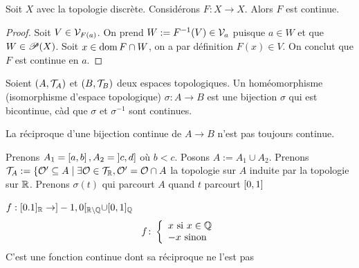 \begin{exemple}
Soit $X$ avec la topologie discrète. Considérons $F:X \to X$. Alors $F$ est continue. 
\end{exemple}
\begin{proof}
    Soit $V\in \mathcal{V}_{F(a)}$. On prend $W:=F^{-1}(V)\in \mathcal{V}_a$ puisque $a\in W$ et que $W\in \mathscr{P}(X)$. Soit $x\in \operatorname{dom} F\cap W$, on a par définition $F(x)\in V$. On conclut que $F$ est continue en $a$.
\end{proof}
\begin{definition}[Homéomorphisme]
Soient $(A,\mathcal{T}_A)$ et $(B,\mathcal{T}_B)$ deux espaces topologiques. Un homéomorphisme (isomorphisme d'espace topologique) $\sigma:A\to B$ est une bijection $\sigma$ qui est bicontinue, càd que $\sigma$ et $\sigma^{-1}$ sont continues.
\end{definition}
\begin{remarque}
    La réciproque d'une bijection continue de $A\to B$ n'est pas toujours continue.
\end{remarque}
\begin{exemple}
    Prenons $A_1 = \left[ a,b\right],A_2 = \left]  c, d\right]$ où $b<c$. Posons $A:=A_1\cup A_2$. Prenons $\mathcal{T}_A:=\{\mathcal{O}'\subseteq A\mid  \exists\mathcal{O}\in\mathcal{T}_{\mathbb{R}}, \mathcal{O}' = \mathcal{O}\cap A$ la topologie sur $A$ induite par la topologie sur $\mathbb{R}$. Prenons $\sigma(t)$ qui parcourt $A$ quand $t$ parcourt $\left[ 0,1\right]$
\end{exemple}
\begin{remarque}
    $f:[0.1]_{\mathbb{R}} \to ]-1,0[_{\mathbb{R}\setminus\mathbb{Q}}\cup [0,1]_{\mathbb{Q}}$
    \[
    f\colon \left\{\begin{array}{l}x \text{ si } x\in \mathbb{Q} \\-x \text{ sinon}\end{array}\right.
    \]
    C'est une fonction continue dont sa réciproque ne l'est pas
\end{remarque}
\centering
{} %

